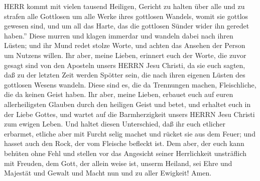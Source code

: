 HERR kommt mit vielen tausend Heiligen,  Gericht zu halten
über alle und zu strafen alle Gottlosen um alle Werke ihres gottlosen
Wandels, womit sie gottlos gewesen sind, und um all das Harte, das die
gottlosen Sünder wider ihn geredet haben.''  Diese murren
und klagen immerdar und wandeln dabei nach ihren Lüsten; und ihr Mund
redet stolze Worte, und achten das Ansehen der Person um Nutzens willen.
 Ihr aber, meine Lieben, erinnert euch der Worte, die zuvor
gesagt sind von den Aposteln unsers HERRN Jesu Christi,  da
sie euch sagten, daß zu der letzten Zeit werden Spötter sein, die nach
ihren eigenen Lüsten des gottlosen Wesens wandeln.  Diese
sind es, die da Trennungen machen, Fleischliche, die da keinen Geist
haben.  Ihr aber, meine Lieben, erbauet euch auf euren
allerheiligsten Glauben durch den heiligen Geist und betet,
 und erhaltet euch in der Liebe Gottes, und wartet auf die
Barmherzigkeit unsers HERRN Jesu Christi zum ewigen Leben. 
Und haltet diesen Unterschied, daß ihr euch etlicher erbarmet,
 etliche aber mit Furcht selig machet und rücket sie aus
dem Feuer; und hasset auch den Rock, der vom Fleische befleckt ist.
 Dem aber, der euch kann behüten ohne Fehl und stellen vor
das Angesicht seiner Herrlichkeit unsträflich mit Freuden, 
dem Gott, der allein weise ist, unserm Heiland, sei Ehre und Majestät
und Gewalt und Macht nun und zu aller Ewigkeit! Amen.
